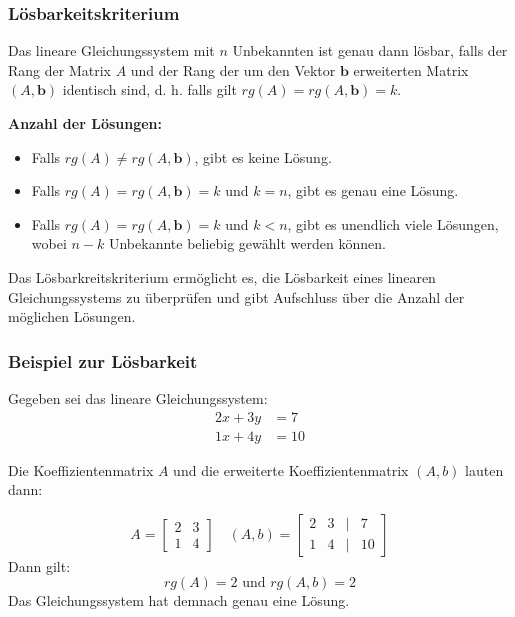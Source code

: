 \documentclass{beamer}
\begin{document}
\begin{frame}
  \frametitle{Lösbarkeitskriterium}
  
  Das lineare Gleichungssystem mit $n$ Unbekannten ist genau dann lösbar, falls der Rang der Matrix $A$ und der Rang der um den Vektor $\mathbf{b}$ erweiterten Matrix $(A, \mathbf{b})$ identisch sind, d. h. falls gilt $rg(A) = rg(A, \mathbf{b}) = k$.
  
  \vspace{0.3cm}
  
  \textbf{Anzahl der Lösungen:}
  
  \begin{itemize}
    \item Falls $rg(A) \neq rg(A, \mathbf{b})$, gibt es keine Lösung.
    \item Falls $rg(A) = rg(A, \mathbf{b}) = k$ und $k = n$, gibt es genau eine Lösung.
    \item Falls $rg(A) = rg(A, \mathbf{b}) = k$ und $k < n$, gibt es unendlich viele Lösungen, wobei $n - k$ Unbekannte beliebig gewählt werden können.
  \end{itemize}
  
  \vspace{0.3cm}
  
  Das Lösbarkreitskriterium ermöglicht es, die Lösbarkeit eines linearen Gleichungssystems zu überprüfen und gibt Aufschluss über die Anzahl der möglichen Lösungen.
\end{frame}

\begin{frame}
  \frametitle{Beispiel zur Lösbarkeit}
  Gegeben sei das lineare Gleichungssystem:
  \[
    \begin{aligned}
      2x + 3y &= 7 \\
      1x + 4y &= 10
    \end{aligned}
  \]

  Die Koeffizientenmatrix $A$ und die erweiterte Koeffizientenmatrix $(A, b)$ lauten dann:

  \[
    A=\begin{bmatrix}
      2 & 3  \\
      1 & 4
    \end{bmatrix}
    \quad
    (A,b)=\begin{bmatrix}
      2 & 3 & | & 7 \\
      1 & 4 & | & 10
    \end{bmatrix}
  \]
  Dann gilt:
  \[rg(A) = 2 \text{ und } rg(A,b) = 2\]
  Das Gleichungssystem hat demnach genau eine Lösung.

\end{frame}
\end{document}
